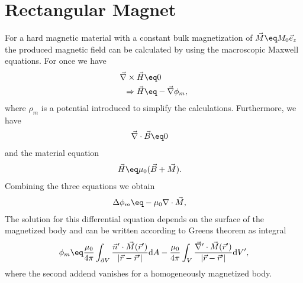 \documentclass[\main/dresen_thesis.tex]{subfiles}
\begin{document}
\section{Rectangular Magnet}\label{ch:appendix:numericalMethods:rectangularMagnet}
For a hard magnetic material with a constant bulk magnetization of $\vec{M} \eq M_0 \vec{e}_z$ the produced magnetic field can be calculated by using the macroscopic Maxwell equations. For once we have
\begin{align}
  \vec{\nabla} \times \vec{H} \eq& 0\\
  \Rightarrow \vec{H} \eq& - \vec{\nabla} \phi_m,
\end{align}
where $\rho_{m}$ is a potential introduced to simplify the calculations. Furthermore, we have
\begin{align}
  \vec{\nabla}  \cdot \vec{B} \eq& 0
\end{align}
and the material equation
\begin{align}
  \vec{H} \eq& \mu_0 (\vec{B} + \vec{M}).
\end{align}
Combining the three equations we obtain
\begin{align}
  \Delta \phi_m \eq& - \mu_0 \nabla \cdot \vec{M},
\end{align}
The solution for this differential equation depends on the surface of the magnetized body and can be written according to Greens theorem as integral
\begin{align}
\phi_m \eq \frac{\mu_0}{4 \pi} \int_{\partial V} \frac{\vec{n}^\prime \cdot \vec{M}(\vec{r}^\prime)}{\left| \vec{r} - \vec{r}^\prime \right|} \mathrm{d}A - \frac{\mu_0}{4 \pi} \int_V \frac{\vec{\nabla}^\prime \cdot \vec{M}(\vec{r}^\prime)}{\left| \vec{r} - \vec{r}^\prime \right|} \mathrm{d}V^\prime,
\end{align}
where the second addend vanishes for a homogeneously magnetized body.
\end{document}
